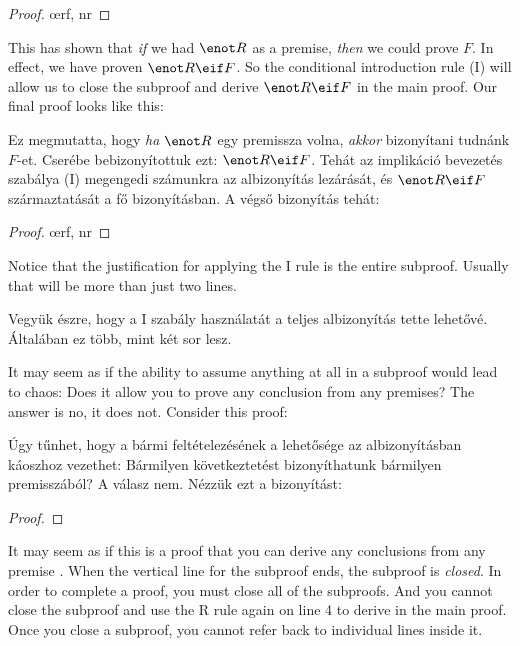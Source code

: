 \begin{proof}
	\open
		\oe{rf, nr}
	\close
\end{proof}

This has shown that \emph{if} we had $\enot R$ as a premise, \emph{then} we could prove $F$. In effect, we have proven $\enot R \eif F$. So the conditional introduction rule ({\eif}I) will allow us to close the subproof and derive $\enot R \eif F$ in the main proof. Our final proof looks like this:

Ez megmutatta, hogy \emph{ha} $\enot R$ egy premissza volna, \emph{akkor} bizonyítani tudnánk $F$-et. Cserébe bebizonyítottuk ezt: $\enot R \eif F$. Tehát az implikáció bevezetés szabálya ({\eif}I) megengedi számunkra az albizonyítás lezárását, és $\enot R \eif F$ származtatását a fő bizonyításban. A végső bizonyítás tehát:


\begin{proof}
	\open
		\oe{rf, nr}
	\close
\end{proof}


Notice that the justification for applying the {\eif}I rule is the entire subproof. Usually that will be more than just two lines.

Vegyük észre, hogy a {\eif}I szabály használatát a teljes albizonyítás tette lehetővé. Általában ez több, mint két sor lesz.

It may seem as if the ability to assume anything at all in a subproof would lead to chaos: Does it allow you to prove any conclusion from any premises? The answer is no, it does not. Consider this proof:

Úgy tűnhet, hogy a bármi feltételezésének a lehetősége az albizonyításban káoszhoz vezethet: Bármilyen következtetést bizonyíthatunk bármilyen premisszából? A válasz nem. Nézzük ezt a bizonyítást:



\begin{proof}
	\open
		 
	\close
\end{proof}

It may seem as if this is a proof that you can derive any conclusions  from any premise . When the vertical line for the subproof ends, the subproof is \emph{closed}. In order to complete a proof, you must close all of the subproofs. And you cannot close the subproof and use the R rule again on line 4 to derive  in the main proof. Once you close a subproof, you cannot refer back to individual lines inside it.

